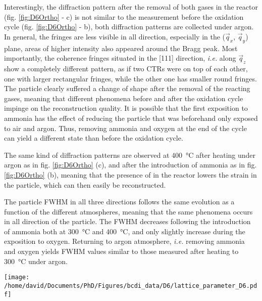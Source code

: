 Interestingly, the diffraction pattern after the removal of both gases in the reactor (fig. \ref{fig:D6Ortho} - c) is not similar to the measurement before the oxidation cycle (fig. \ref{fig:D6Ortho} - b), both diffraction patterns are collected under argon.
In general, the fringes are less visible in all direction, especially in the ($\vec{q}_x$, $\vec{q}_y$) plane, areas of higher intensity also appeared around the Bragg peak.
Most importantly, the coherence fringes situated in the [111] direction, \textit{i.e.} along $\vec{q}_z$ show a completely different pattern, as if two CTRs were on top of each other, one with larger rectangular fringes, while the other one has smaller round fringes.
The particle clearly suffered a change of shape after the removal of the reacting gases, meaning that different phenomena before and after the oxidation cycle impinge on the reconstruction quality.
It is possible that the first exposition to ammonia has the effect of reducing the particle that was beforehand only exposed to air and argon.
Thus, removing ammonia and oxygen at the end of the cycle can yield a different state than before the oxidation cycle.

The same kind of diffraction patterns are observed at \qty{400}{\degreeCelsius} after heating under argon as in fig. \ref{fig:D6Ortho} (c), and after the introduction of ammonia as in fig. \ref{fig:D6Ortho} (b), meaning that the presence of  in the reactor lowers the strain in the particle, which can then easily be reconstructed.

The particle FWHM in all three directions follows the same evolution as a function of the different atmospheres, meaning that the same phenomena occurs in all direction of the particle.
The FWHM decreases following the introduction of ammonia both at \qty{300}{\degreeCelsius} and \qty{400}{\degreeCelsius}, and only slightly increase during the exposition to oxygen.
Returning to argon atmosphere, \textit{i.e.} removing ammonia and oxygen yields FWHM values similar to those measured after heating to \qty{300}{\degreeCelsius} under argon.

\begin{SCfigure}
    \centering
    \texttt{[image: /home/david/Documents/PhD/Figures/bcdi\_data/D6/lattice\_parameter\_D6.pdf]}
    \caption{
        Evolution of the interplanar spacing $d_{111}$ and homogeneous strain $\epsilon_{111}$ for particle C as a function of the ammonia to oxygen ratio.
        The reference for the computation of $\epsilon_{111}$ was taken at \qty{25}{\degreeCelsius}.
        The reproduction of measurements at fixed conditions yield multiple data points, lines at \qty{300}{\degreeCelsius} and \qty{400}{\degreeCelsius} link the data points in the order of the measurements.
        No scans were performed at \qty{400}{\degreeCelsius} under Argon after the oxidation cycle.
    }
    \label{fig:D6Latpara}
\end{SCfigure}

